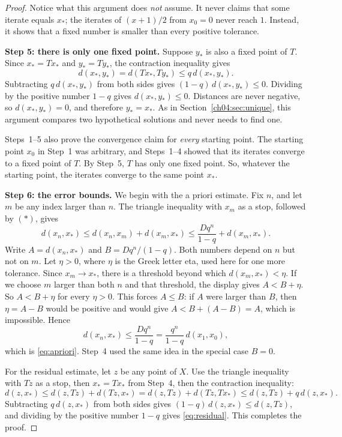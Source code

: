 \begin{proof}
Notice what this argument does \emph{not} assume. It never claims that some iterate equals $x_*$; the iterates of $(x+1)/2$ from $x_0=0$ never reach $1$. Instead, it shows that a fixed number is smaller than every positive tolerance.

\textbf{Step 5: there is only one fixed point.} Suppose $y_*$ is also a fixed point of $T$. Since $x_*=Tx_*$ and $y_*=Ty_*$, the contraction inequality gives
\[
d(x_*,y_*)=d(Tx_*,Ty_*)\le q\,d(x_*,y_*).
\]
Subtracting $q\,d(x_*,y_*)$ from both sides gives $(1-q)\,d(x_*,y_*)\le0$. Dividing by the positive number $1-q$ gives $d(x_*,y_*)\le0$. Distances are never negative, so $d(x_*,y_*)=0$, and therefore $y_*=x_*$. As in Section~\ref{ch04:sec:unique}, this argument compares two hypothetical solutions and never needs to find one.

Steps~1--5 also prove the convergence claim for \emph{every} starting point. The starting point $x_0$ in Step~1 was arbitrary, and Steps~1--4 showed that its iterates converge to a fixed point of $T$. By Step~5, $T$ has only one fixed point. So, whatever the starting point, the iterates converge to the same point $x_*$.

\textbf{Step 6: the error bounds.} We begin with the a priori estimate. Fix $n$, and let $m$ be any index larger than $n$. The triangle inequality with $x_m$ as a stop, followed by $(*)$, gives
\[
d(x_n,x_*)\le d(x_n,x_m)+d(x_m,x_*)
\le\frac{Dq^n}{1-q}+d(x_m,x_*).
\]
Write $A=d(x_n,x_*)$ and $B=Dq^n/(1-q)$. Both numbers depend on $n$ but not on $m$. Let $\eta>0$, where $\eta$ is the Greek letter eta, used here for one more tolerance. Since $x_m\to x_*$, there is a threshold beyond which $d(x_m,x_*)<\eta$. If we choose $m$ larger than both $n$ and that threshold, the display gives $A<B+\eta$. So $A<B+\eta$ for every $\eta>0$. This forces $A\le B$: if $A$ were larger than $B$, then $\eta=A-B$ would be positive and would give $A<B+(A-B)=A$, which is impossible. Hence
\[
d(x_n,x_*)\le\frac{Dq^n}{1-q}=\frac{q^n}{1-q}\,d(x_1,x_0),
\]
which is \eqref{eq:apriori}. Step~4 used the same idea in the special case $B=0$.

For the residual estimate, let $z$ be any point of $X$. Use the triangle inequality with $Tz$ as a stop, then $x_*=Tx_*$ from Step~4, then the contraction inequality:
\[
d(z,x_*)\le d(z,Tz)+d(Tz,x_*)=d(z,Tz)+d(Tz,Tx_*)
\le d(z,Tz)+q\,d(z,x_*).
\]
Subtracting $q\,d(z,x_*)$ from both sides gives $(1-q)\,d(z,x_*)\le d(z,Tz)$, and dividing by the positive number $1-q$ gives \eqref{eq:residual}. This completes the proof.
\end{proof}

